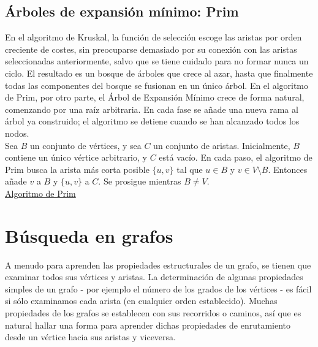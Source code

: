 
\subsection{Árboles de expansión mínimo: Prim}
\label{sec:prim}

En el algoritmo de Kruskal, la función de selección escoge las aristas por orden creciente de costes, sin preocuparse demasiado por su conexión con las aristas seleccionadas anteriormente, salvo que se tiene cuidado para no formar nunca un ciclo. El resultado es un bosque de árboles que crece al azar, hasta que finalmente todas las componentes del bosque se fusionan en un único árbol. En el algoritmo de Prim, por otro parte, el Árbol de Expansión Mínimo crece de forma natural, comenzando por una raíz arbitraria. En cada fase se añade una nueva rama al árbol ya construido; el algoritmo se detiene cuando se han alcanzado todos los nodos.\\

Sea $B$ un conjunto de vértices, y sea $C$ un conjunto de aristas. Inicialmente, $B$ contiene un único vértice arbitrario, y $C$ está vacío. En cada paso, el algoritmo de Prim busca la arista más corta posible $\{u,v\}$ tal que $u \in B$ y $v \in V \setminus B$. Entonces añade $v$ a $B$ y $\{u,v\}$ a $C$. Se prosigue mientras $B \ne V$.\\

\underline{Algoritmo de Prim}\\



\section{Búsqueda en grafos}

A menudo para aprenden las propiedades estructurales de un grafo, se tienen que examinar todos sus vértices y aristas. La determinación de algunas propiedades simples de un grafo - por ejemplo el número de los grados de los vértices - es fácil si sólo examinamos cada arista (en cualquier orden establecido). Muchas propiedades de los grafos se establecen con sus recorridos o caminos, así que es natural hallar una forma para aprender dichas propiedades de enrutamiento desde un vértice hacia sus aristas y viceversa.\\

